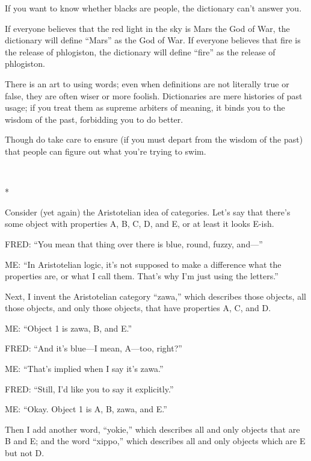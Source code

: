{
 If you want to know whether blacks are people, the dictionary
can't answer you.}

{
 If everyone believes that the red light in the sky is Mars the God
of War, the dictionary will define
``Mars'' as the God of War. If
everyone believes that fire is the release of phlogiston, the
dictionary will define ``fire'' as
the release of phlogiston.}

{
 There is an art to using words; even when definitions are not
literally true or false, they are often wiser or more foolish.
Dictionaries are mere histories of past usage; if you treat them as
supreme arbiters of meaning, it binds you to the wisdom of the past,
forbidding you to do better.}

{
 Though do take care to ensure (if you must depart from the wisdom
of the past) that people can figure out what you're
trying to swim.}

{\centering
 \ ~
\par}

{\centering
 *
\par}


{
 Consider (yet again) the Aristotelian idea of categories.
Let's say that there's some object with
properties A, B, C, D, and E, or at least it looks E-ish.}

{
 FRED: ``You mean that thing over there is blue,
round, fuzzy, and---''}

{
 ME: ``In Aristotelian logic, it's
not supposed to make a difference what the properties are, or what I
call them. That's why I'm just using
the letters.''}

{
 Next, I invent the Aristotelian category
``zawa,'' which describes those
objects, all those objects, and only those objects, that have
properties A, C, and D.}

{
 ME: ``Object 1 is zawa, B, and
E.''}

{
 FRED: ``And it's blue---I mean,
A---too, right?''}

{
 ME: ``That's implied when I say
it's zawa.''}

{
 FRED: ``Still, I'd like you to
say it explicitly.''}

{
 ME: ``Okay. Object 1 is A, B, zawa, and
E.''}

{
 Then I add another word,
``yokie,'' which describes all and
only objects that are B and E; and the word
``xippo,'' which describes all and
only objects which are E but not D.}

